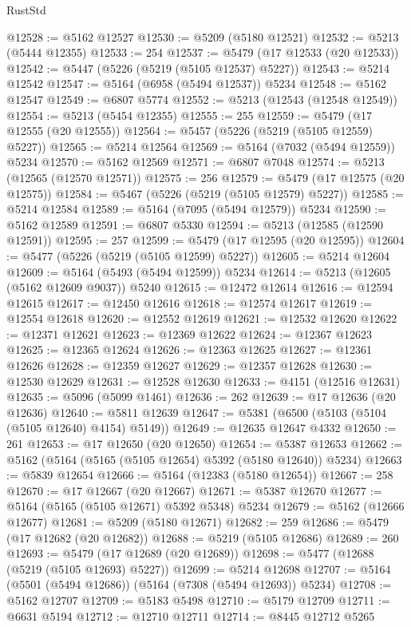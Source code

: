 \begin{lexlean}{RustStd}
\begin{coremodule}
@12528 := @5162 @12527
@12530 := @5209 (@5180 @12521)
@12532 := @5213 (@5444 @12355)
@12533 := 254
@12537 := @5479 (@17 @12533 (@20 @12533))
@12542 := @5447 (@5226 (@5219 (@5105 @12537) @5227))
@12543 := @5214 @12542
@12547 := @5164 (@6958 (@5494 @12537)) @5234
@12548 := @5162 @12547
@12549 := @6807 @5774
@12552 := @5213 (@12543 (@12548 @12549))
@12554 := @5213 (@5454 @12355)
@12555 := 255
@12559 := @5479 (@17 @12555 (@20 @12555))
@12564 := @5457 (@5226 (@5219 (@5105 @12559) @5227))
@12565 := @5214 @12564
@12569 := @5164 (@7032 (@5494 @12559)) @5234
@12570 := @5162 @12569
@12571 := @6807 @7048
@12574 := @5213 (@12565 (@12570 @12571))
@12575 := 256
@12579 := @5479 (@17 @12575 (@20 @12575))
@12584 := @5467 (@5226 (@5219 (@5105 @12579) @5227))
@12585 := @5214 @12584
@12589 := @5164 (@7095 (@5494 @12579)) @5234
@12590 := @5162 @12589
@12591 := @6807 @5330
@12594 := @5213 (@12585 (@12590 @12591))
@12595 := 257
@12599 := @5479 (@17 @12595 (@20 @12595))
@12604 := @5477 (@5226 (@5219 (@5105 @12599) @5227))
@12605 := @5214 @12604
@12609 := @5164 (@5493 (@5494 @12599)) @5234
@12614 := @5213 (@12605 (@5162 @12609 @9037)) @5240
@12615 := @12472 @12614
@12616 := @12594 @12615
@12617 := @12450 @12616
@12618 := @12574 @12617
@12619 := @12554 @12618
@12620 := @12552 @12619
@12621 := @12532 @12620
@12622 := @12371 @12621
@12623 := @12369 @12622
@12624 := @12367 @12623
@12625 := @12365 @12624
@12626 := @12363 @12625
@12627 := @12361 @12626
@12628 := @12359 @12627
@12629 := @12357 @12628
@12630 := @12530 @12629
@12631 := @12528 @12630
@12633 := @4151 (@12516 @12631)
@12635 := @5096 (@5099 @1461)
@12636 := 262
@12639 := @17 @12636 (@20 @12636)
@12640 := @5811 @12639
@12647 := @5381 (@6500 (@5103 (@5104 (@5105 @12640) @4154) @5149))
@12649 := @12635 @12647 @4332
@12650 := 261
@12653 := @17 @12650 (@20 @12650)
@12654 := @5387 @12653
@12662 := @5162 (@5164 (@5165 (@5105 @12654) @5392 (@5180 @12640)) @5234)
@12663 := @5839 @12654
@12666 := @5164 (@12383 (@5180 @12654))
@12667 := 258
@12670 := @17 @12667 (@20 @12667)
@12671 := @5387 @12670
@12677 := @5164 (@5165 (@5105 @12671) @5392 @5348) @5234
@12679 := @5162 (@12666 @12677)
@12681 := @5209 (@5180 @12671)
@12682 := 259
@12686 := @5479 (@17 @12682 (@20 @12682))
@12688 := @5219 (@5105 @12686)
@12689 := 260
@12693 := @5479 (@17 @12689 (@20 @12689))
@12698 := @5477 (@12688 (@5219 (@5105 @12693) @5227))
@12699 := @5214 @12698
@12707 := @5164 (@5501 (@5494 @12686)) (@5164 (@7308 (@5494 @12693)) @5234)
@12708 := @5162 @12707
@12709 := @5183 @5498
@12710 := @5179 @12709
@12711 := @6631 @5194
@12712 := @12710 @12711
@12714 := @8445 @12712 @5265

\end{coremodule}
\end{lexlean}
